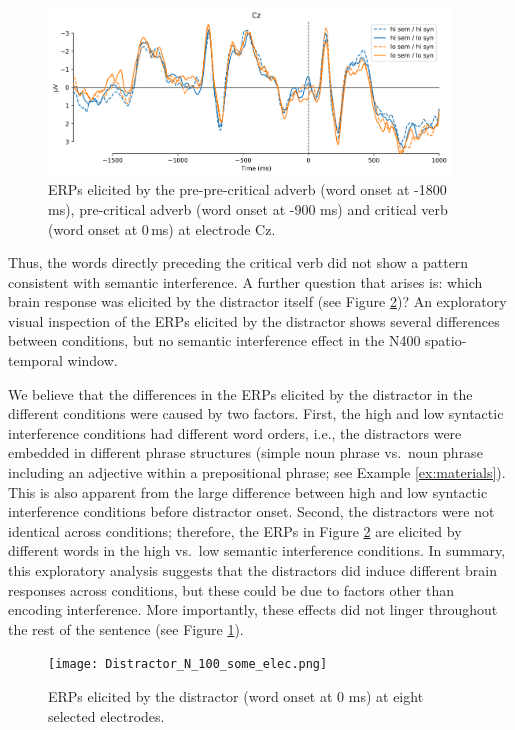 \documentclass[review,preprint,12pt,authoryear,floatsintext]{elsarticle}
\begin{document}
{{\begin{figure}[ht]
    \caption{ERPs elicited by the pre-pre-critical adverb (word onset at -1800 ms), pre-critical adverb (word onset at -900 ms) and critical verb (word onset at 0\,ms) at electrode Cz.}
    \label{fig:erp_precrit}
    \centering
    \includegraphics[width=0.95\textwidth]{N_103_Cz_precrit.png}
\end{figure}

Thus, the words directly preceding the critical verb did not show a pattern consistent with semantic interference. A further question that arises is: which brain response was elicited by the distractor itself (see Figure \ref{fig:erp_distractor})? An exploratory visual inspection of the ERPs elicited by the distractor shows several differences between conditions, but no semantic interference effect in the N400 spatio-temporal window. 

We believe that the differences in the ERPs elicited by the distractor in the different conditions were caused by two factors. First, the high and low syntactic interference conditions had different word orders, i.e., the distractors were embedded in different phrase structures (simple noun phrase vs.\ noun phrase including an adjective within a prepositional phrase; see Example \ref{ex:materials}). This is also apparent from the large difference between high and low syntactic interference conditions before distractor onset. Second, the distractors were not identical across conditions; therefore, the ERPs in Figure \ref{fig:erp_distractor} are elicited by different words in the high vs.\ low semantic interference conditions. In summary, this exploratory analysis suggests that the distractors did induce different brain responses across conditions, but these could be due to factors other than encoding interference. More importantly, these effects did not linger throughout the rest of the sentence (see Figure \ref{fig:erp_precrit}). 

\begin{figure}[ht]
    \centering
        \caption{ERPs elicited by the distractor (word onset at 0 ms) at eight selected electrodes.}
    \label{fig:erp_distractor}\texttt{[image: Distractor\_N\_100\_some\_elec.png]}
\end{figure}

}}
\end{document}
